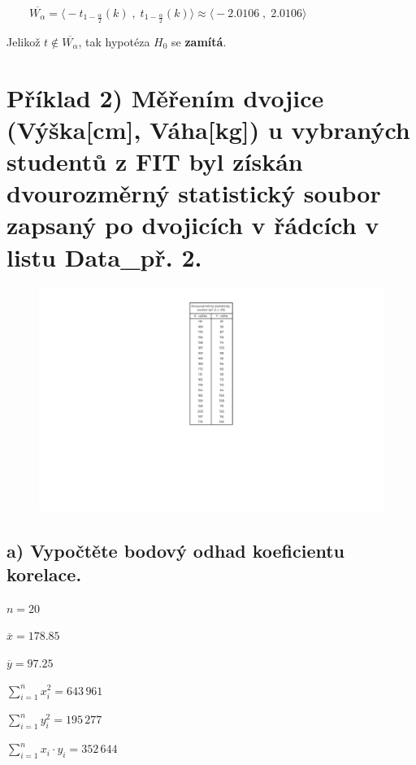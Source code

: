 \documentclass[11pt, a4paper, titlepage]{article}
\begin{document}
${\displaystyle \qquad \overline{W_\alpha} = \big\langle -t_{1 - \frac{\alpha}{2}}(k) \;,\; t_{1 - \frac{\alpha}{2}}(k) \big\rangle \approx \big\langle -2.0106 \;,\; 2.0106 \big\rangle}$
\medskip

Jelikož ${\displaystyle t \notin \overline{W_\alpha}}$, tak hypotéza ${\displaystyle H_0}$ se \textbf{zamítá}.

\newpage


\section*{Příklad 2) Měřením dvojice (Výška[cm], Váha[kg]) u vybraných studentů z FIT byl získán dvourozměrný statistický soubor zapsaný po dvojicích v řádcích v listu Data\_př. 2.}

\begin{figure}[H]
    \centering
    \includegraphics[width=.25\linewidth]{images/2-1-crop.pdf}
\end{figure}

\noindent\makebox[\linewidth]{\rule{\paperwidth}{0.3pt}}


\subsection*{a) Vypočtěte bodový odhad koeficientu korelace.}
\bigskip

\begin{minipage}{0.49\textwidth}
    ${\displaystyle n = 20}$
    \medskip

    ${\displaystyle \overline{x} = 178.85}$
    \medskip

    ${\displaystyle \overline{y} = 97.25}$
\end{minipage}
%
\begin{minipage}{0.49\textwidth}
    ${\displaystyle \sum_{i=1}^n x_i^2 = 643 \, 961}$
    \medskip

    ${\displaystyle \sum_{i=1}^n y_i^2 = 195 \, 277}$
    \medskip

    ${\displaystyle \sum_{i=1}^n x_i \cdot y_i = 352 \, 644}$
\end{minipage}
\bigskip
\end{document}
